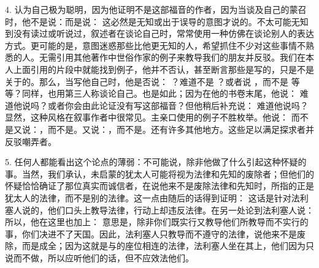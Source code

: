 4. 认为自己极为聪明，因为他证明不是这部福音的作者，因为当谈及自己的蒙召时，他不是说：而是说： 这必然是无知或出于误导的意图才说的。不太可能无知到没有读过或听说过，叙述者在谈论自己时，常常使用一种仿佛在谈论别人的表达方式。更可能的是，意图迷惑那些比他更无知的人，希望抓住不少对这些事情不熟悉的人。无需引用其他著作中世俗作家的例子来教导我们的朋友并反驳。我们在本人上面引用的片段中就能找到例子，他并不否认，甚至断言那些是写的，只是不是关于的。那么，当写他自己时，他是否说： ？难道不是 ？或者说 ，而不是 等等？同样，也用第三人称谈论自己。也是如此；因为在他的书卷末尾，他说： 难道他说吗？或者你会由此论证没有写这部福音？但他稍后补充说： 难道他说吗？显然，这种风格在叙事作者中很常见。主亲口使用的例子不胜枚举。他说： 而不是又说：，而不是。又说：，而不是。还有许多其他地方。这些足以满足探求者并反驳嘲弄者。\par

5. 任何人都能看出这个论点的薄弱：不可能说，除非他做了什么引起这种怀疑的事。当然，我们承认，未启蒙的犹太人可能将视为法律和先知的废除者；但他们的怀疑恰恰确证了那位真实而诚信者，在说他来不是废除法律和先知时，所指的正是犹太人的法律，而不是别的法律。这一点由随后的话得到证明： 这话是针对法利塞人说的，他们口头上教导法律，行动上却违反法律。在另一处论到法利塞人说： 所以，他在这里也加上： 意思是，除非你们既实行又教导他们所教导而不实行的事，你们决进不了天国。因此，法利塞人只教导而不遵守的法律，说他来不是废除，而是成全；因为这就是与的座位相连的法律，法利塞人坐在其上，他们因为只说而不做，所以应听他们的话，但不应效法他们。\par

